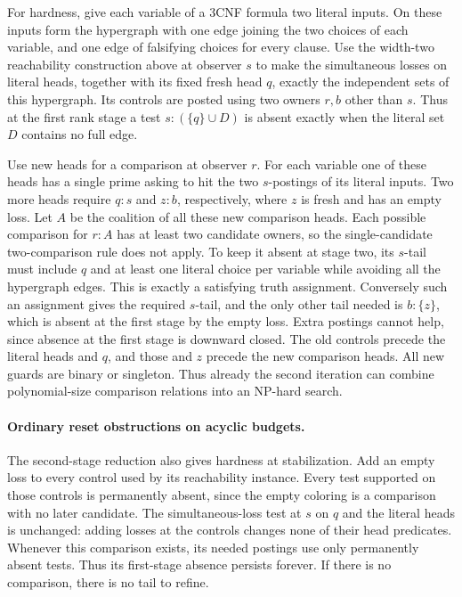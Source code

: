 For hardness, give each variable of a 3CNF
formula two literal inputs. On these inputs
form the hypergraph with one edge joining
the two choices of each variable, and one
edge of falsifying choices for every clause.
Use the width-two reachability construction
above at observer $s$ to make the simultaneous
losses on literal heads, together with its
fixed fresh head $q$, exactly the independent
sets of this hypergraph. Its controls are
posted using two owners $r,b$ other than $s$.
Thus at the first rank stage a test
$s:(\{q\}\cup D)$ is absent exactly when
the literal set $D$ contains no full edge.

Use new heads for a comparison at observer
$r$. For each variable one of these heads
has a single prime asking to hit the two
$s$-postings of its literal inputs. Two more
heads require $q{:}s$ and $z{:}b$, respectively,
where $z$ is fresh and has an empty loss.
Let $A$ be the coalition of all these new
comparison heads. Each possible comparison
for $r:A$ has at least two candidate owners,
so the single-candidate two-comparison rule does not apply.
To keep it absent at stage two, its $s$-tail
must include $q$ and at least one literal
choice per variable while avoiding all the
hypergraph edges. This is exactly a satisfying
truth assignment. Conversely such an
assignment gives the required $s$-tail, and
the only other tail needed is $b:\{z\}$,
which is absent at the first stage by the
empty loss. Extra postings cannot help,
since absence at the first stage is
downward closed. The old controls precede
the literal heads and $q$, and those and
$z$ precede the new comparison heads.
All new guards are binary or singleton.
Thus already the second iteration can
combine polynomial-size comparison relations
into an NP-hard search.

\paragraph{Ordinary reset obstructions on acyclic budgets.}
The second-stage reduction also gives hardness
at stabilization. Add an empty loss to every
control used by its reachability instance.
Every test supported on those controls is
permanently absent, since the empty coloring
is a comparison with no later candidate.
The simultaneous-loss test at $s$ on $q$ and
the literal heads is unchanged: adding losses
at the controls changes none of their head
predicates. Whenever this comparison exists,
its needed postings use only permanently
absent tests. Thus its first-stage absence
persists forever. If there is no comparison,
there is no tail to refine.

